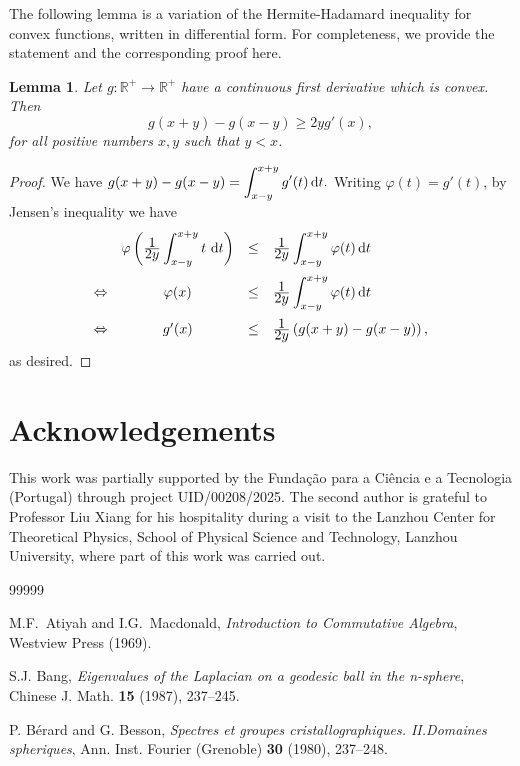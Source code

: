 \documentclass[11pt,a4paper,times]{amsart}
\theoremstyle{plain}
\newtheorem{lemma}[thm]{Lemma}
\theoremstyle{definition}
\numberwithin{equation}{section}
\newcommand{\ds}{\displaystyle}
\newcommand{\dint}{\ds\int}
\newcommand{\eqskip}{ \vspace*{2mm}\\ }
\newcommand{\R}{\mathbb{R}}
\newcommand{\fr}[2]{\frac{\ds #1}{\ds #2}}
\begin{document}
{The following lemma is a variation of the Hermite-Hadamard inequality for convex functions, written in differential form. 
For completeness, we provide the statement and the corresponding proof here.
\begin{lemma}\label{auxconvlemma}
 Let $g:\R^{+}\to \R^{+}$ have a continuous first derivative which is convex. Then
 \[
  g(x+y) - g(x-y) \geq 2y g'(x),
 \]
 for all positive numbers $x,y$ such that $y<x$.
\end{lemma}
\begin{proof}
 We have $g(x+y) -g(x-y) = \dint_{x-y}^{x+y} g'(t) \, {\rm d} t.$ Writing $\varphi(t) = g'(t)$, by Jensen's inequality
 we have
 \[
 \begin{array}{lcll}
  & \varphi\left( \fr{1}{2y} \dint_{x-y}^{x+y} t \ {\rm d}t\right) & \leq  & \fr{1}{2y} \dint_{x-y}^{x+y} \varphi(t) \, {\rm d}t\eqskip
  \Leftrightarrow & \varphi(x) & \leq & \fr{1}{2y} \dint_{x-y}^{x+y} \varphi(t) \, {\rm d}t\eqskip
  \Leftrightarrow & g'(x) & \leq & \fr{1}{2y} \left( g(x+y) - g(x-y)\right),
 \end{array}
 \]
as desired.
\end{proof}

\section*{Acknowledgements} This work was partially supported by the Funda\c c\~{a}o para a Ci\^{e}ncia e a Tecnologia (Portugal) through project UID/00208/2025.
The second author is grateful to Professor Liu Xiang for his hospitality during a visit to the Lanzhou Center for Theoretical Physics, School of
Physical Science and Technology, Lanzhou University, where part of this work was carried out.

\begin{thebibliography}{99999}

 M.F.\ Atiyah and  I.G.\ Macdonald, 
\emph{Introduction to Commutative Algebra}, 
Westview Press (1969).

 S.J. Bang,
 \emph{Eigenvalues of the Laplacian on a geodesic ball in the n-sphere}, Chinese J. Math. {\bf 15} (1987), 237--245.

 P. B\'{e}rard and G. Besson, \emph{Spectres et groupes cristallographiques. II.Domaines spheriques}, Ann. Inst. Fourier (Grenoble) {\bf 30} (1980),
237--248.





\end{thebibliography}}
\end{document}
